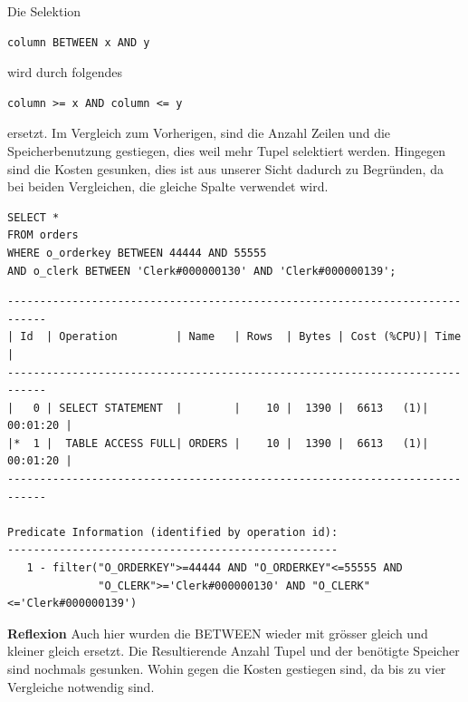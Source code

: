 \documentclass[10pt]{article}
\begin{document}
Die Selektion 
\begin{lstlisting}[style=sqlNoTitle]
column BETWEEN x AND y 
\end{lstlisting}
wird durch folgendes 
\begin{lstlisting}[style=sqlNoTitle]
column >= x AND column <= y 
\end{lstlisting}
ersetzt. Im Vergleich zum Vorherigen, sind die Anzahl Zeilen und die 
Speicherbenutzung gestiegen, dies weil mehr Tupel selektiert werden. Hingegen 
sind die Kosten gesunken, dies ist aus unserer Sicht dadurch zu Begründen, da 
bei beiden Vergleichen, die gleiche Spalte verwendet wird.

\begin{lstlisting}[style=sql]
SELECT *
FROM orders
WHERE o_orderkey BETWEEN 44444 AND 55555
AND o_clerk BETWEEN 'Clerk#000000130' AND 'Clerk#000000139';
\end{lstlisting}
\begin{lstlisting}[style=queryexecutionplan]
----------------------------------------------------------------------------
| Id  | Operation         | Name   | Rows  | Bytes | Cost (%CPU)| Time     |
----------------------------------------------------------------------------
|   0 | SELECT STATEMENT  |        |    10 |  1390 |  6613   (1)| 00:01:20 |
|*  1 |  TABLE ACCESS FULL| ORDERS |    10 |  1390 |  6613   (1)| 00:01:20 |
----------------------------------------------------------------------------

Predicate Information (identified by operation id):
---------------------------------------------------
   1 - filter("O_ORDERKEY">=44444 AND "O_ORDERKEY"<=55555 AND 
              "O_CLERK">='Clerk#000000130' AND "O_CLERK"<='Clerk#000000139')
\end{lstlisting}
\textbf{Reflexion} \newline
Auch hier wurden die BETWEEN wieder mit grösser gleich und kleiner gleich ersetzt. 
Die Resultierende Anzahl Tupel und der benötigte Speicher sind nochmals gesunken. 
Wohin gegen die Kosten gestiegen sind, da bis zu vier Vergleiche notwendig sind.
\end{document}
